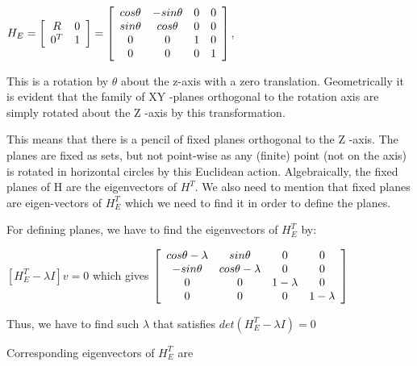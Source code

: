 \documentclass[]{article}
\begin{document}
\centerline {
	$H_E = \left[ {\begin{array}{*{20}c}
		R & 0 \\
		0^T & 1   
		\end{array} } \right] =  \left[ {\begin{array}{*{20}c}
		cos \theta & -sin \theta & 0 & 0 \\
		sin \theta & cos \theta  & 0 & 0 \\ 
		0 & 0 & 1 & 0 \\ 
		0 & 0 & 0 & 1   
		\end{array} } \right] $,
}

\vspace{0.5em}

This is a rotation by $ \theta $ about the z-axis with a zero translation. Geometrically it is evident that the family of XY -planes orthogonal to the rotation axis are simply rotated about the Z -axis by this transformation.

This means that there is a pencil of fixed planes orthogonal to the Z -axis. The planes
are fixed as sets, but not point-wise as any (finite) point (not on the axis) is rotated in horizontal circles by this Euclidean action. Algebraically, the fixed planes of H are the eigenvectors of $H^T$. We also need to mention that fixed planes are eigen-vectors of $H_E^T$ which we need to find it in order to define the planes. 

For defining planes, we have to find the eigenvectors of $H_E^T$ by:

\vspace{0.5em}

\centerline {
	$[H_E^T - \lambda I]v = 0 $ which gives $\left[ {\begin{array}{*{20}c}
		cos \theta - \lambda & sin \theta & 0 & 0 \\
		-sin \theta & cos \theta - \lambda & 0 & 0 \\ 
		0 & 0 & 1 - \lambda & 0 \\ 
		0 & 0 & 0 & 1 - \lambda   
		\end{array} } \right] $
}

\vspace{0.5em}

Thus, we have to find such $\lambda$ that satisfies $det(H_E^T - \lambda I) = 0$

\vspace{0.5em}

Corresponding eigenvectors of $H_E^T$ are 

\vspace{0.5em}
\end{document}
